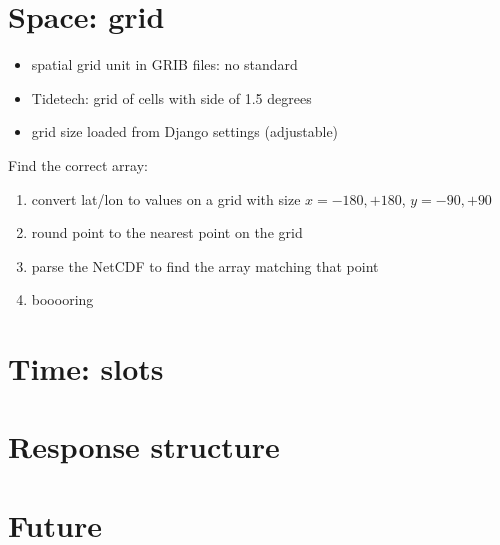 \documentclass[xcolor=svgnames]{beamer}
\begin{document}
\section{Space: grid}

    \begin{frame}
        \begin{itemize}
            \item spatial grid unit in GRIB files: no standard
            \item Tidetech: grid of cells with side of 1.5 degrees
            \item grid size loaded from Django settings (adjustable)
        \end{itemize}
        \note{\scriptsize{}}
        \note{\scriptsize{}}
        Find the correct array:
        \begin{enumerate}
            \item convert lat/lon to values on a grid with size $x={-180,+180}$, $y={-90,+90}$
            \pause
            \item round point to the nearest point on the grid
            \pause
            \item parse the NetCDF to find the array matching that point
            \pause
            \item booooring
        \end{enumerate}
    \end{frame}

\section{Time: slots}

    \begin{frame}
    \end{frame}

\section{Response structure}

    \begin{frame}
    \end{frame}

\section{Future}
\end{document}
